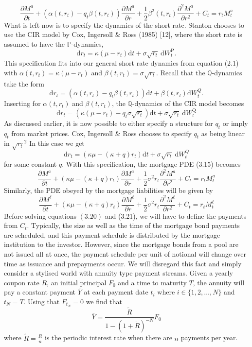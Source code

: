 \documentclass[12pt,twoside]{reedthesis}
\begin{document}
\[
\frac{\partial M^{a}}{\partial t}+\left(\alpha\left(t, r_{t}\right)-q_{t} \beta\left(t, r_{t}\right)\right) \frac{\partial M^{a}}{\partial r}+\frac{1}{2} \beta^{2}\left(t, r_{t}\right) \frac{\partial^{2} M^{a}}{\partial r^{2}}+C_{t}=r_{t} M_{t}^{a}
\]
What is left now is to specify the dynamics of the short rate. Stanton chooses to use the CIR model by Cox, Ingersoll \& Ross (1985) {[}12{]}, where the short rate is assumed to have the \(\mathbb{P}\)-dynamics,
\[
\mathrm{d} r_{t}=\kappa\left(\mu-r_{t}\right) \mathrm{d} t+\sigma \sqrt{r_{t}} \mathrm{~d} W_{t}^{\mathrm{P}} .
\]
This specification fits into our general short rate dynamics from equation (2.1) with \(\alpha\left(t, r_{t}\right)=\kappa\left(\mu-r_{t}\right)\) and \(\beta\left(t, r_{t}\right)=\sigma \sqrt{r_{t}}\). Recall that the \(\mathbb{Q}\)-dynamics take the form
\[
\mathrm{d} r_{t}=\left(\alpha\left(t, r_{t}\right)-q_{t} \beta\left(t, r_{t}\right)\right) \mathrm{d} t+\beta\left(t, r_{t}\right) \mathrm{d} W_{t}^{Q} .
\]
Inserting for \(\alpha\left(t, r_{t}\right)\) and \(\beta\left(t, r_{t}\right)\), the \(\mathbb{Q}\)-dynamics of the CIR model becomes
\[
\mathrm{d} r_{t}=\left(\kappa\left(\mu-r_{t}\right)-q_{t} \sigma \sqrt{r_{t}}\right) \mathrm{d} t+\sigma \sqrt{r_{t}} \mathrm{~d} W_{t}^{\mathrm{Q}}
\]
As discussed earlier, it is now possible to either specify a structure for \(q_{t}\) or imply \(q_{t}\) from market prices. Cox, Ingersoll \& Ross chooses to specify \(q_{t}\) as being linear in \(\sqrt{r_{t}}{ }^{2}\) In this case we get
\[
\mathrm{d} r_{t}=\left(\kappa \mu-(\kappa+q) r_{t}\right) \mathrm{d} t+\sigma \sqrt{r_{t}} \mathrm{~d} W_{t}^{Q}
\]
for some constant \(q\). With this specification, the mortgage PDE (3.15) becomes
\[
\frac{\partial M^{a}}{\partial t}+\left(\kappa \mu-(\kappa+q) r_{t}\right) \frac{\partial M^{a}}{\partial r}+\frac{1}{2} \sigma^{2} r_{t} \frac{\partial^{2} M^{a}}{\partial r^{2}}+C_{t}=r_{t} M_{t}^{a}
\]
Similarly, the PDE obeyed by the mortgage liabilities will be given by
\[
\frac{\partial M^{\ell}}{\partial t}+\left(\kappa \mu-(\kappa+q) r_{t}\right) \frac{\partial M^{\ell}}{\partial r}+\frac{1}{2} \sigma^{2} r_{t} \frac{\partial^{2} M^{\ell}}{\partial r^{2}}+C_{t}=r_{t} M_{t}^{\ell}
\]
Before solving equations \((3.20)\) and (3.21), we will have to define the payments from \(C_{t}\). Typically, the size as well as the time of the mortgage bond payments are scheduled, and this payment schedule is distributed by the mortgage institution to the investor. However, since the mortgage bonds from a pool are not issued all at once, the payment schedule per unit of notional will change over time as issuance and prepayments occur. We will disregard this fact and simply consider a stylised world with annuity type payment streams. Given a yearly coupon rate \(R\), an initial principal \(F_{0}\) and a time to maturity \(T\), the annuity will pay a constant payment \(\bar{Y}\) at each payment date \(t_{i}\) where \(i \in\{1,2, \ldots, N\}\) and \(t_{N}=T\). Using that \(F_{t_{N}}=0\) we find that
\[
\bar{Y}=\frac{\widetilde{R}}{1-(1+\widetilde{R})^{-N}} F_{0}
\]
where \(\widetilde{R}=\frac{R}{n}\) is the periodic interest rate when there are \(n\) payments per year.
\end{document}
